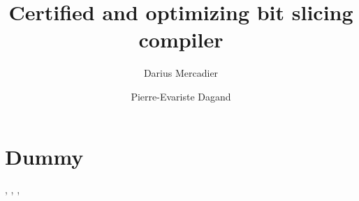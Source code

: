\documentclass[a4paper]{report}
\title{Certified and optimizing bit slicing compiler}
\author{Darius Mercadier
\and Pierre-Evariste Dagand}
\begin{document}
\maketitle
\newpage

\section{Dummy}
\citep{Biham1997}, \citep{eprint-2000-11395}, \citep{thomaspornin2001}, \citep{randallfisher1997}

\citet{randallfisher1997}




\end{document}
